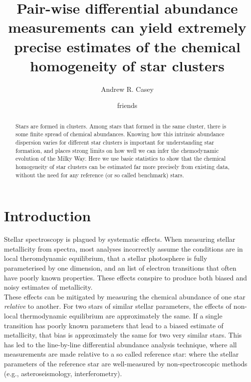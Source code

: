\documentclass[modern]{aastex631}
\newcommand{\chosentitle}{Pair-wise differential abundance measurements can yield extremely precise estimates of the chemical homogeneity of star clusters}
\begin{document}
\title{\chosentitle}

\author[0000-0003-0174-0564]{Andrew R. Casey}

\author{friends}


\begin{abstract}\noindent
    Stars are formed in clusters. Among stars that formed in the same cluster, there is some finite spread of chemical abundances. Knowing how this intrinsic abundance dispersion varies for different star clusters is important for understanding star formation, and places strong limits on how well we can infer the chemodynamic evolution of the Milky Way. Here we use basic statistics to show that the chemical homogeneity of star clusters can be estimated far more precisely from existing data, without the need for any reference (or so called benchmark) stars.
\end{abstract}



\section{Introduction} \label{sec:introduction}
Stellar spectroscopy is plagued by systematic effects. When measuring stellar metallicity from spectra, most analyses incorrectly assume the conditions are in local theromdynamic equilibrium, that a stellar photosphere is fully parameterised by one dimension, and an list of electron transitions that often have poorly known properties. These effects conspire to produce both biased and noisy estimates of metallicity.\\

These effects can be mitigated by measuring the chemical abundance of one star \emph{relative} to another. For two stars of similar stellar parameters, the effects of non-local thermodynamic equilibrium are approximately the same. If a single transition has poorly known parameters that lead to a biased estimate of metallicity, that bias is approximately the same for two very similar stars. This has led to the line-by-line differential abundance analysis technique, where all measurements are made relative to a so called reference star: where the stellar parameters of the reference star are well-measured by non-spectroscopic methods (e.g., asteroseismology, interferometry).\\
\end{document}
